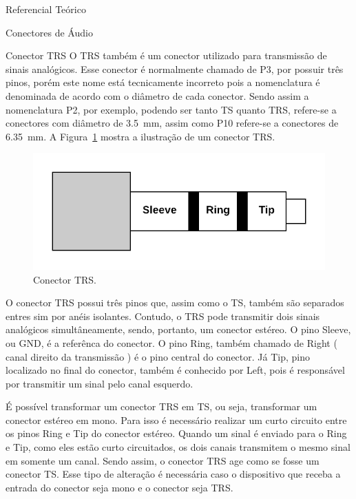 \begin{chapter}{Referencial Teórico}
\begin{section}{Conectores de Áudio}
\begin{subsection}{Conector TRS}
O TRS também é um conector utilizado para transmissão de sinais analógicos. Esse
conector é normalmente chamado de P3, por possuir três pinos, porém este nome
está tecnicamente incorreto pois a nomenclatura é denominada de acordo com o
diâmetro de cada conector. Sendo assim a nomenclatura P2, por exemplo, podendo
ser tanto TS quanto TRS,  refere-se a conectores com diâmetro de 3.5~mm, assim
como P10 refere-se a conectores de 6.35~mm. A Figura~\ref{fig:TRS} mostra a
ilustração de um conector TRS.

\begin{figure}[!h]
	\centering
	\begin{minipage}[c]{\textwidth}
	\centering
	\includegraphics[width=0.9\linewidth]{fig/trs}
	\caption{Conector TRS.}
	\label{fig:TRS}
	\end{minipage}
\end{figure} 

O conector TRS possui três pinos que, assim como o TS, também são separados 
entres sim por anéis isolantes. Contudo, o TRS pode transmitir dois sinais
analógicos simultâneamente, sendo, portanto, um conector estéreo. O pino Sleeve,
ou GND, é a referênca do conector. O pino Ring, também chamado de Right ( canal 
direito da transmissão ) é o  pino central do conector. Já Tip, pino localizado
no final do conector, também é conhecido por Left, pois é responsável por
transmitir um sinal pelo canal esquerdo.

É possível transformar um conector TRS em TS, ou seja, transformar um conector
estéreo em mono. Para isso é necessário realizar um curto circuito entre os
pinos Ring e Tip do conector estéreo. Quando um sinal é enviado para o Ring e
Tip, como eles estão curto circuitados, os dois canais transmitem o mesmo
sinal em somente um canal. Sendo assim, o conector TRS age como se fosse um
conector TS. Esse tipo de alteração é necessária caso o dispositivo que receba a
entrada do conector seja mono e o conector seja TRS. 


\end{subsection}
\end{section}
\end{chapter}
